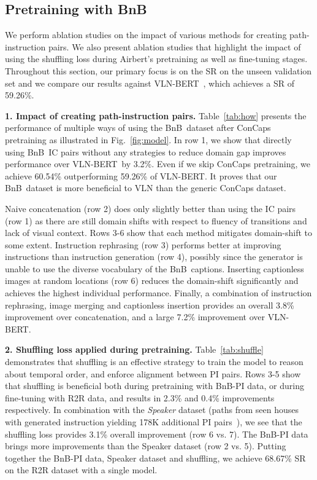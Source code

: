 \RequirePackage[dvipsnames,table]{xcolor} \documentclass[10pt,twocolumn,letterpaper]{article}
\newcommand{\p}[1]{\vspace{1mm}\noindent\textbf{#1}}
\newcommand{\vlnbert}{VLN-BERT}
\newcommand{\airbert}{Airbert}
\newcommand{\airbnb}{BnB}
\begin{document}
 
\subsection{Pretraining with \airbnb}
\label{sec:xp_pretrain_airbert}
We perform ablation studies on the impact of various methods for creating path-instruction pairs.
We also present ablation studies that highlight the impact of using the shuffling loss during \airbert's pretraining as well as fine-tuning stages.
Throughout this section, our primary focus is on the SR on the unseen validation set and we compare our results against \vlnbert~\cite{majumdar2020vlnbert}, which achieves a SR of 59.26\%.




\p{1. Impact of creating path-instruction pairs.}
Table~\ref{tab:how} presents the performance of multiple ways of using the \airbnb~dataset after ConCaps pretraining as illustrated in Fig.~\ref{fig:model}.
In row 1, we show that directly using \airbnb~IC pairs without any strategies to reduce domain gap improves performance over \vlnbert~by 3.2\%.
Even if we skip ConCaps pretraining, we achieve 60.54\% outperforming 59.26\% of \vlnbert.
It proves that our \airbnb~dataset is more beneficial to VLN than the generic ConCaps dataset.


Naive concatenation (row 2) does only slightly better than using the IC pairs (row 1) as there are still domain shifts with respect to fluency of transitions and lack of visual context.
Rows 3-6 show that each method mitigates domain-shift to some extent.
Instruction rephrasing (row 3) performs better at improving instructions than instruction generation (row 4), possibly since the generator is unable to use the diverse vocabulary of the \airbnb~captions.
Inserting captionless images at random locations (row 6) reduces the domain-shift significantly and achieves the highest individual performance.
Finally, a combination of instruction rephrasing, image merging and captionless insertion provides an overall 3.8\% improvement over concatenation, and a large 7.2\% improvement over \vlnbert.


\p{2. Shuffling loss applied during pretraining.} 
Table~\ref{tab:shuffle} demonstrates that shuffling is an effective strategy to train the model to reason about temporal order, and enforce alignment between PI pairs.
Rows 3-5 show that shuffling is beneficial both during pretraining with \airbnb-PI data, or during fine-tuning with R2R data, and results in 2.3\% and 0.4\% improvements respectively.
In combination with the \emph{Speaker} dataset (paths from seen houses with generated instruction yielding 178K additional PI pairs~\cite{tan2019envdrop}), we see that the shuffling loss provides 3.1\% overall improvement (row 6 vs. 7).
The \airbnb-PI data brings more improvements than the Speaker dataset (row 2 vs. 5).
Putting together the \airbnb-PI data, Speaker dataset and shuffling, we achieve 68.67\% SR on the R2R dataset with a single model.
\end{document}
